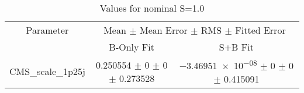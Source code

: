 \begin{table}
\centering
\caption{Values for nominal S=1.0}
\begin{tabular}{ccc}
\toprule
Parameter 	& \multicolumn{2}{c}{Mean $\pm$ Mean Error $\pm$ RMS $\pm$ Fitted Error}\\
 	& B-Only Fit & S+B Fit\\
\midrule
CMS\_scale\_1p25j 	& \num{0.250554} $\pm$ \num{0} $\pm$ \num{0} $\pm$ \num{0.273528} 	& \num{-3.46951e-08} $\pm$ \num{0} $\pm$ \num{0} $\pm$ \num{0.415091}\\
\bottomrule
\end{tabular}
\end{table}